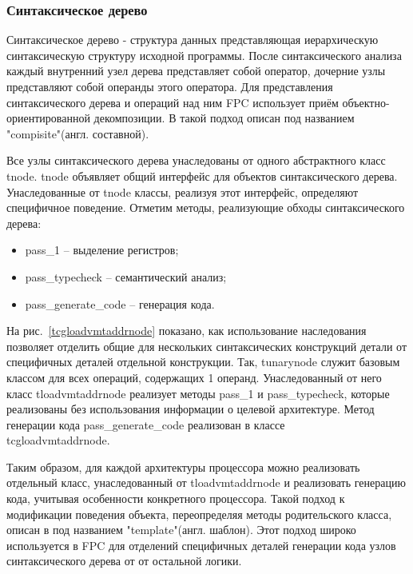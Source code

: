 \documentclass{imcs}
\begin{document}
\subsubsection{Синтаксическое дерево}

Синтаксическое дерево - структура данных представляющая иерархическую синтаксическую
структуру исходной программы\cite{dragonbook}. После синтаксического анализа каждый внутренний узел 
дерева представляет собой оператор, дочерние узлы представляют собой операнды этого
оператора. Для представления синтаксического дерева и операций над ним FPC использует
приём объектно-ориентированной декомпозиции. В \cite{gof} такой подход описан под
названием "compisite"(англ. составной).

Все узлы синтаксического дерева унаследованы от одного абстрактного класс tnode.
tnode объявляет общий интерфейс для объектов синтаксического дерева. Унаследованные
от tnode классы, реализуя этот интерфейс, определяют специфичное поведение. Отметим
методы, реализующие обходы синтаксического дерева:
\begin{itemize}
    \item pass\_1 -- выделение регистров;
    \item pass\_typecheck -- семантический анализ;
    \item pass\_generate\_code -- генерация кода.
\end{itemize}

На рис.~\ref{tcgloadvmtaddrnode} показано, как использование наследования позволяет отделить общие для 
нескольких синтаксических конструкций детали от специфичных деталей отдельной конструкции.
Так, tunarynode служит базовым классом для всех операций, содержащих 1 операнд.
Унаследованный от него класс tloadvmtaddrnode реализует методы pass\_1 и pass\_typecheck,
которые реализованы без использования информации о целевой архитектуре. Метод
генерации кода pass\_generate\_code реализован в классе \\ tcgloadvmtaddrnode.

Таким образом, для каждой архитектуры процессора можно реализовать отдельный класс, 
унаследованный от tloadvmtaddrnode и реализовать генерацию кода, 
учитывая особенности конкретного процессора.
Такой подход к модификации поведения объекта, переопределяя методы родительского класса,
описан в \cite{gof} под названием "template"(англ. шаблон). Этот подход широко
используется в FPC для отделений специфичных деталей генерации кода узлов синтаксического
дерева от от остальной логики.
\end{document}
